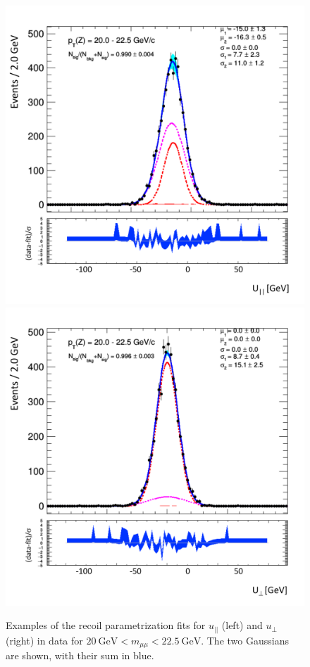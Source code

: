 \begin{figure}
\centering
\includegraphics[width=0.49\linewidth]{plots/Recoil/example-data-pfu1fit_12.pdf}
\includegraphics[width=0.49\linewidth]{plots/Recoil/example-data-pfu2fit_12.pdf}
\caption{Examples of the recoil parametrization fits for $u_{||}$ (left) and $u_{\perp}$ (right) in data for $20~\mathrm{GeV} < m_{\mu\mu}  < 22.5~\mathrm{GeV}$. The two Gaussians are shown, with their sum in blue.}
\label{fig:recoil:data_fit_example}
\end{figure}